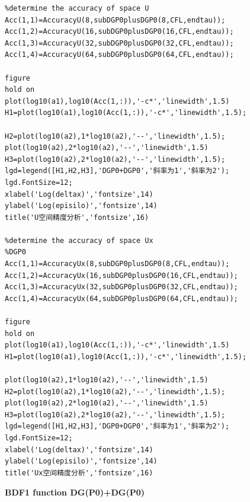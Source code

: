 \documentclass[a4paper,11pt,UTF8]{article}%
\theoremstyle{plain}
\begin{document}
\begin{lstlisting}
%determine the accuracy of space U
Acc(1,1)=AccuracyU(8,subDGP0plusDGP0(8,CFL,endtau));
Acc(1,2)=AccuracyU(16,subDGP0plusDGP0(16,CFL,endtau));
Acc(1,3)=AccuracyU(32,subDGP0plusDGP0(32,CFL,endtau));
Acc(1,4)=AccuracyU(64,subDGP0plusDGP0(64,CFL,endtau));
	
figure
hold on
plot(log10(a1),log10(Acc(1,:)),'-c*','linewidth',1.5)
H1=plot(log10(a1),log10(Acc(1,:)),'-c*','linewidth',1.5);
	
H2=plot(log10(a2),1*log10(a2),'--','linewidth',1.5);
plot(log10(a2),2*log10(a2),'--','linewidth',1.5)
H3=plot(log10(a2),2*log10(a2),'--','linewidth',1.5);
lgd=legend([H1,H2,H3],'DGP0+DGP0','斜率为1','斜率为2');
lgd.FontSize=12;
xlabel('Log(deltax)','fontsize',14)
ylabel('Log(episilo)','fontsize',14)
title('U空间精度分析','fontsize',16)
	
%determine the accuracy of space Ux
%DGP0
Acc(1,1)=AccuracyUx(8,subDGP0plusDGP0(8,CFL,endtau));
Acc(1,2)=AccuracyUx(16,subDGP0plusDGP0(16,CFL,endtau));
Acc(1,3)=AccuracyUx(32,subDGP0plusDGP0(32,CFL,endtau));
Acc(1,4)=AccuracyUx(64,subDGP0plusDGP0(64,CFL,endtau));
	
figure
hold on
plot(log10(a1),log10(Acc(1,:)),'-c*','linewidth',1.5)
H1=plot(log10(a1),log10(Acc(1,:)),'-c*','linewidth',1.5);
	
plot(log10(a2),1*log10(a2),'--','linewidth',1.5)
H2=plot(log10(a2),1*log10(a2),'--','linewidth',1.5);
plot(log10(a2),2*log10(a2),'--','linewidth',1.5)
H3=plot(log10(a2),2*log10(a2),'--','linewidth',1.5);
lgd=legend([H1,H2,H3],'DGP0+DGP0','斜率为1','斜率为2');
lgd.FontSize=12;
xlabel('Log(deltax)','fontsize',14)
ylabel('Log(episilo)','fontsize',14)
title('Ux空间精度分析','fontsize',16)
	\end{lstlisting}
\newpage
\noindent \textbf{BDF1 function DG(P0)+DG(P0)}
\end{document}
